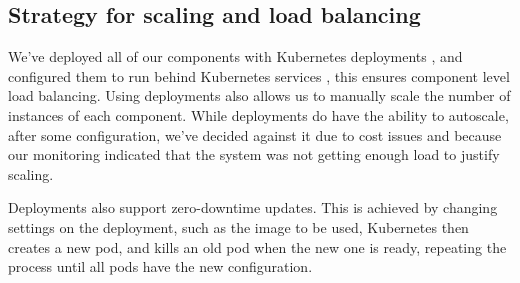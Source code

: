 \subsection{Strategy for scaling and load balancing}
We've deployed all of our components with Kubernetes deployments \cite{docs:kubernetes-deployment}, and configured them to run behind Kubernetes services \cite{docs:kubernetes-service}, this ensures component level load balancing.
Using deployments also allows us to manually scale the number of instances of each component. While deployments do have the ability to autoscale, after some configuration, we've decided against it due to cost issues and because our monitoring indicated that the system was not getting enough load to justify scaling.

Deployments also support zero-downtime updates. This is achieved by changing settings on the deployment, such as the image to be used, Kubernetes then creates a new pod, and kills an old pod when the new one is ready, repeating the process until all pods have the new configuration.
